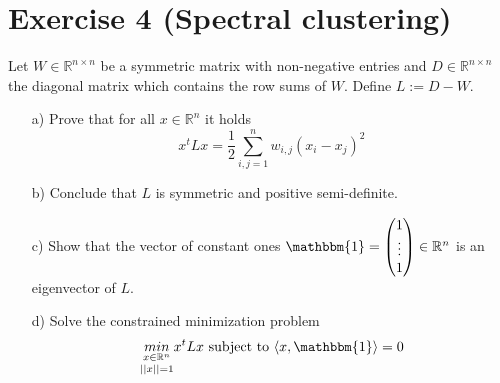 \documentclass[10pt]{article}
\numberwithin{equation}{section}
\begin{document}
\section*{Exercise 4 (Spectral clustering)}
Let $W \in \mathbb{R}^{n\times n}$ be a symmetric matrix with non-negative entries and $D \in \mathbb{R}^{n\times n}$ the diagonal matrix which contains the row sums of $W$. Define $L := D - W$.


\begin{enumerate}
\item[a)]{
    Prove that for all $x \in \mathbb{R}^n$ it holds
    $$ x^t Lx = \frac{1}{2} \sum_{i,j=1}^n w_{i,j} (x_i - x_j)^2$$
  }
\item[b)]{
    Conclude that $L$ is symmetric and positive semi-definite.
  }
\item[c)]{
    Show that the vector of constant ones $\mathbbm{1} = \begin{pmatrix} 1 \\ \vdots \\ 1\end{pmatrix} \in \mathbb{R}^n$ is an eigenvector of $L$.
  }
\item[d)]{
  Solve the constrained minimization problem
  $$\underset{||x|| = 1}{\underset{x\in \mathbb{R}^n}{min}} x^t Lx \text{ subject to }\langle x, \mathbbm{1} \rangle = 0$$
}
\end{enumerate}
\end{document}
